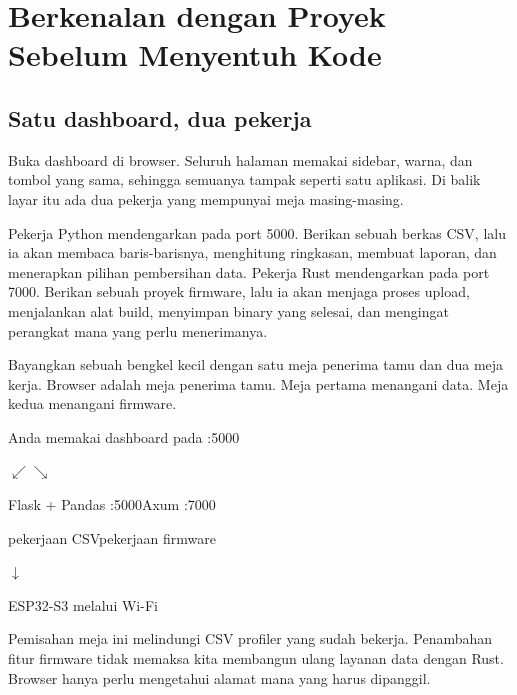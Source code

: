 \chapter{Berkenalan dengan Proyek Sebelum Menyentuh Kode}

\section{Satu dashboard, dua pekerja}

Buka dashboard di browser. Seluruh halaman memakai sidebar, warna, dan tombol yang sama, sehingga semuanya tampak seperti satu aplikasi. Di balik layar itu ada dua pekerja yang mempunyai meja masing-masing.

Pekerja Python mendengarkan pada port 5000. Berikan sebuah berkas CSV, lalu ia akan membaca baris-barisnya, menghitung ringkasan, membuat laporan, dan menerapkan pilihan pembersihan data. Pekerja Rust mendengarkan pada port 7000. Berikan sebuah proyek firmware, lalu ia akan menjaga proses upload, menjalankan alat build, menyimpan binary yang selesai, dan mengingat perangkat mana yang perlu menerimanya.

Bayangkan sebuah bengkel kecil dengan satu meja penerima tamu dan dua meja kerja. Browser adalah meja penerima tamu. Meja pertama menangani data. Meja kedua menangani firmware.

\begin{center}
\begin{tcolorbox}[width=0.9\textwidth,colback=BookPaper,colframe=BookTealLight,arc=3pt]
\centering\ttfamily
Anda memakai dashboard pada :5000\par
\vspace{0.25em}
$\swarrow$\hspace{7em}$\searrow$\par
\vspace{0.25em}
Flask + Pandas :5000\hspace{3em}Axum :7000\par
pekerjaan CSV\hspace{6.4em}pekerjaan firmware\par
\hspace*{13em}$\downarrow$\par
\hspace*{10em}ESP32-S3 melalui Wi-Fi
\end{tcolorbox}
\end{center}

Pemisahan meja ini melindungi CSV profiler yang sudah bekerja. Penambahan fitur firmware tidak memaksa kita membangun ulang layanan data dengan Rust. Browser hanya perlu mengetahui alamat mana yang harus dipanggil.


